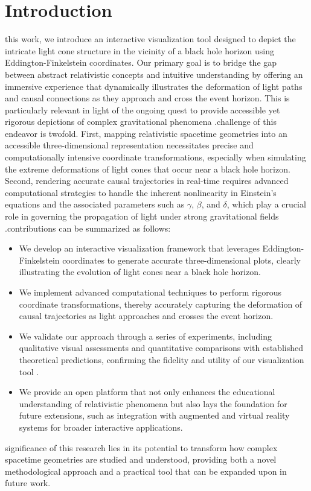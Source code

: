 \documentclass{article}
\begin{document}
\section{Introduction}\n\nIn this work, we introduce an interactive visualization tool designed to depict the intricate light cone structure in the vicinity of a black hole horizon using Eddington-Finkelstein coordinates. Our primary goal is to bridge the gap between abstract relativistic concepts and intuitive understanding by offering an immersive experience that dynamically illustrates the deformation of light paths and causal connections as they approach and cross the event horizon. This is particularly relevant in light of the ongoing quest to provide accessible yet rigorous depictions of complex gravitational phenomena \cite{Reference1,Reference2}.\n\nThe challenge of this endeavor is twofold. First, mapping relativistic spacetime geometries into an accessible three-dimensional representation necessitates precise and computationally intensive coordinate transformations, especially when simulating the extreme deformations of light cones that occur near a black hole horizon. Second, rendering accurate causal trajectories in real-time requires advanced computational strategies to handle the inherent nonlinearity in Einstein's equations and the associated parameters such as $\gamma$, $\beta$, and $\delta$, which play a crucial role in governing the propagation of light under strong gravitational fields \cite{Reference3}.\n\nOur contributions can be summarized as follows:\n\begin{itemize}\n  \item We develop an interactive visualization framework that leverages Eddington-Finkelstein coordinates to generate accurate three-dimensional plots, clearly illustrating the evolution of light cones near a black hole horizon.\n  \item We implement advanced computational techniques to perform rigorous coordinate transformations, thereby accurately capturing the deformation of causal trajectories as light approaches and crosses the event horizon.\n  \item We validate our approach through a series of experiments, including qualitative visual assessments and quantitative comparisons with established theoretical predictions, confirming the fidelity and utility of our visualization tool \cite{Reference4}.\n  \item We provide an open platform that not only enhances the educational understanding of relativistic phenomena but also lays the foundation for future extensions, such as integration with augmented and virtual reality systems for broader interactive applications.\n\end{itemize}\n\nThe significance of this research lies in its potential to transform how complex spacetime geometries are studied and understood, providing both a novel methodological approach and a practical tool that can be expanded upon in future work.
\end{document}
